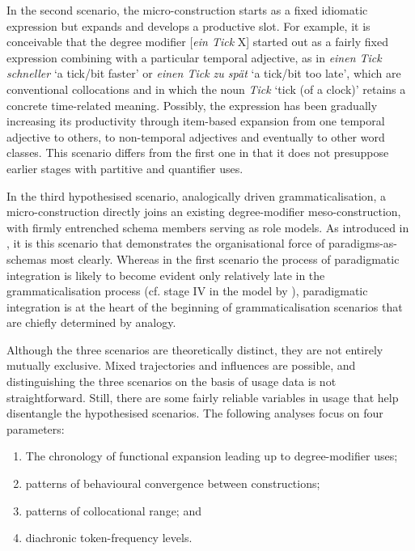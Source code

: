 \documentclass[output=paper]{langsci/langscibook}
\begin{document}
In the second scenario, the micro-construction starts as a fixed idiomatic expression but expands and develops a productive slot. For example, it is conceivable that the degree modifier [\textit{ein Tick} X] started out as a fairly fixed expression combining with a particular temporal adjective, as in \textit{einen Tick schneller} ‘a tick/bit faster’ or \textit{einen Tick zu spät} ‘a tick/bit too late’, which are conventional collocations and in which the noun \textit{Tick} ‘tick (of a clock)’ retains a concrete time-related meaning. Possibly, the expression has been gradually increasing its productivity through item-based expansion from one temporal adjective to others, to non-temporal adjectives and eventually to other word classes. This scenario differs from the first one in that it does not presuppose earlier stages with partitive and quantifier uses. 

In the third hypothesised scenario, analogically driven grammaticalisation, a micro-construction directly joins an existing degree\hyp{}modifier meso-construction, with firmly entrenched schema members serving as role models. As introduced in , it is this scenario that demonstrates the organisational force of paradigms-as-schemas most clearly. Whereas in the first scenario the process of paradigmatic integration is likely to become evident only relatively late in the grammaticalisation process (cf. stage IV in the model by \citealt{DiewaldParadigmaticintegration2012}), paradigmatic integration is at the heart of the beginning of grammaticalisation scenarios that are chiefly determined by analogy. 

Although the three scenarios are theoretically distinct, they are not entirely mutually exclusive. Mixed trajectories and influences are possible, and distinguishing the three scenarios on the basis of usage data is not straightforward. Still, there are some fairly reliable variables in usage that help disentangle the hypothesised scenarios. The following analyses focus on four parameters: 
 
 
\begin{enumerate}[label=(\roman*)]
    \item The chronology of functional expansion leading up to degree\hyp{}modifier uses; 
    \item patterns of behavioural convergence between constructions; 
    \item patterns of collocational range; and 
    \item diachronic token-frequency levels. 
\end{enumerate}
\end{document}

